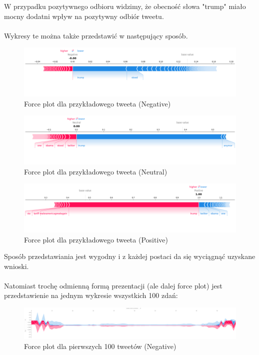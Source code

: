 \documentclass{article}
\begin{document}
\noindent W przypadku pozytywnego odbioru widzimy, że obecność słowa "trump" miało mocny dodatni wpływ na pozytywny odbiór tweetu.
\\
\\
\noindent Wykresy te można także przedstawić w następujący sposób.

\begin{figure}[H]
    \centering
    \includegraphics[width=\textwidth]{assets/force_1_negative.png}
    \caption{Force plot dla przykładowego tweeta (Negative)}
\end{figure}

\begin{figure}[H]
    \centering
    \includegraphics[width=\textwidth]{assets/force_1_neutral.png}
    \caption{Force plot dla przykładowego tweeta (Neutral)}
\end{figure}

\begin{figure}[H]
    \centering
    \includegraphics[width=\textwidth]{assets/force_1_positive.png}
    \caption{Force plot dla przykładowego tweeta (Positive)}
\end{figure}


Sposób przedstawiania jest wygodny i z każdej postaci da się wyciągnąć uzyskane wnioski.
\\
\\
 Natomiast trochę odmienną formą prezentacji (ale dalej force plot) jest przedstawienie na jednym wykresie wszystkich 100 zdań:

\begin{figure}[H]
    \centering
    \includegraphics[width=\textwidth]{assets/force_3_negative.png}
    \caption{Force plot dla pierwszych 100 tweetów (Negative)}
\end{figure}
\end{document}

